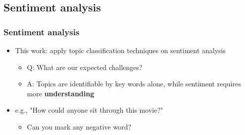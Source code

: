 \documentclass{beamer}
\begin{document}
\subsection{Sentiment analysis}

\begin{frame}
	\frametitle{Sentiment analysis}
	\begin{itemize}
	\item This work: apply topic classification techniques on sentiment analysis
	\begin{itemize}
		\item Q: What are our expected challenges?
		\pause %
		\item A: Topics are identifiable by key words alone, while sentiment requires more \textbf{understanding}
	\end{itemize}
	\end{itemize}
	
	\pause %
	\begin{itemize}
		\item e.g., "How could anyone sit through this movie?"
		\begin{itemize}
			\item Can you mark  any negative word?
		\end{itemize}
	
	\end{itemize}
	
	

\end{frame}
\end{document}
